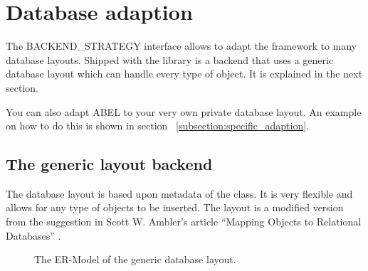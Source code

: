 \section{Database adaption}

The BACKEND\_STRATEGY interface allows to adapt the framework to many database layouts.
Shipped with the library is a backend that uses a generic database layout which can handle every type of object.
It is explained in the next section.

You can also adapt ABEL to your very own private database layout.
An example on how to do this is shown in section ~\ref{subsection:specific_adaption}.

\subsection{The generic layout backend}

The database layout is based upon metadata of the class. 
It is very flexible and allows for any type of objects to be inserted.
The layout is a modified version from the suggestion in Scott W. Ambler's article ``Mapping Objects to Relational Databases'' \cite{AmblerORM}.


\begin{figure} [h!]
\centering
{}
\caption{The ER-Model of the generic database layout.}
\label{fig:er_model_generic_layout}
\end{figure}

